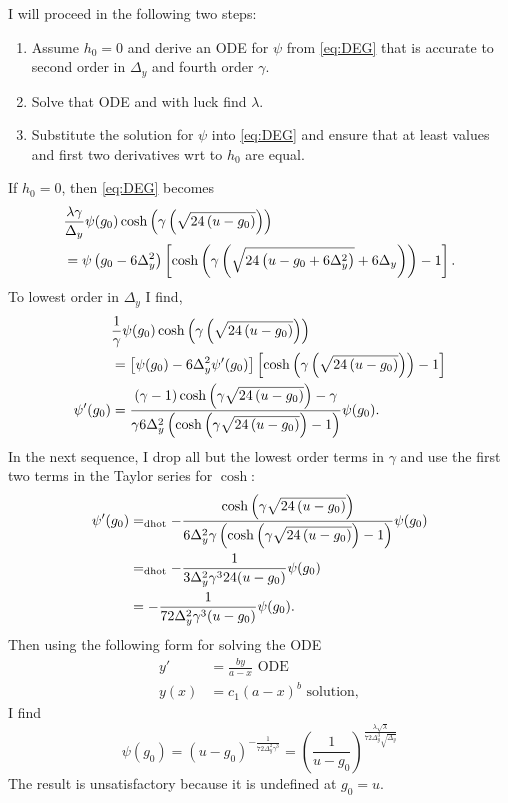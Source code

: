 \documentclass[]{article}
\newcommand{\dhot}{=_{\text{dhot}}}
\begin{document}
I will proceed in the following two steps:
\begin{enumerate}
\item Assume $h_0=0$ and derive an ODE for $\psi$ from \eqref{eq:DEG}
  that is accurate to second order in $\Delta_y$ and fourth order
  $\gamma$.
\item Solve that ODE and with luck find $\lambda$.
\item Substitute the solution for $\psi$ into \eqref{eq:DEG} and
  ensure that at least values and first two derivatives wrt to $h_0$
  are equal.
\end{enumerate}

If $h_0 = 0$, then \eqref{eq:DEG} becomes
\renewcommand{\temp}{g_0 - 6\Delta_y^2}
\renewcommand{\mtemp}{-g_0 +6\Delta_y^2}
\begin{align*}
  & \frac{\lambda \gamma}{\Delta_y} \psi(g_0) \cosh \left( \gamma
    \left( \Rad{-g_0} \right) \right) \\
  &= \psi\left( \temp \right)
  \left[ \cosh
    \left( \gamma
      \left( \Rad{\mtemp} + 6 \Delta_y \right)
    \right) -1
  \right].
\end{align*}
To lowest order in $\Delta_y$ I find,
\newcommand{\coshg}{\cosh\left(\gamma \Rad{-g_0} \right)}
\begin{align*}
  & \frac{1}{\gamma} \psi(g_0)
  \cosh \left( \gamma \left( \Rad{-g_0} \right) \right) \\
  &= \left[\psi(g_0) - 6\Delta_y^2\psi'(g_0) \right]
  \left[ \cosh \left( \gamma \left( \Rad{-g_0} \right) \right) - 1
  \right] \\
  \psi'(g_0) &= \frac{(\gamma-1)\coshg - \gamma }{\gamma 6 \Delta_y^2
  \left( \coshg - 1 \right)} \psi(g_0).
\end{align*}
In the next sequence, I drop all but the lowest order terms in
$\gamma$ and use the first two terms in the Taylor series for
$\cosh$:
\begin{align*}
  \psi'(g_0) &\dhot -\frac{\coshg}{6\Delta_y^2 \gamma \left( \coshg -
      1 \right)} \psi(g_0) \\
  &\dhot -\frac{1}{3 \Delta_y^2 \gamma^3 24(u-g_0)} \psi(g_0) \\
  &= -\frac{1}{72 \Delta_y^2 \gamma^3 (u-g_0)} \psi(g_0).
\end{align*}
Then using the following form for solving the ODE
\begin{align*}
  y' &= \frac{by}{a-x} \text{ ODE} \\
  y(x) &= c_1 (a-x)^b \text{ solution},
\end{align*}
I find
\begin{equation}
  \label{eq:1}
  \psi(g_0) = (u - g_0)^{-\frac{1}{72 \Delta_y^2 \gamma^3}} =
  \left( \frac{1}{u - g_0} \right)^{\frac{\lambda \sqrt{\lambda}}{72
      \Delta_y^3 \sqrt{\Delta_y}}}
\end{equation}
The result is unsatisfactory because it is undefined at $g_0 = u$.
\end{document}
